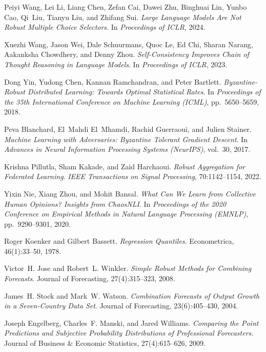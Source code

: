 Peiyi Wang, Lei Li, Liang Chen, Zefan Cai, Dawei Zhu, Binghuai Lin, Yunbo Cao,
Qi~Liu, Tianyu Liu, and Zhifang Sui.
\textit{Large Language Models Are Not Robust Multiple Choice Selectors}.
In \textit{Proceedings of ICLR}, 2024.

Xuezhi Wang, Jason Wei, Dale Schuurmans, Quoc Le, Ed Chi, Sharan Narang,
Aakanksha Chowdhery, and Denny Zhou.
\textit{Self-Consistency Improves Chain of Thought Reasoning in Language Models}.
In \textit{Proceedings of ICLR}, 2023.

Dong Yin, Yudong Chen, Kannan Ramchandran, and Peter Bartlett.
\textit{Byzantine-Robust Distributed Learning: Towards Optimal Statistical Rates}.
In \textit{Proceedings of the 35th International Conference on Machine Learning (ICML)},
pp.~5650--5659, 2018.

Peva Blanchard, El~Mahdi El~Mhamdi, Rachid Guerraoui, and Julien Stainer.
\textit{Machine Learning with Adversaries: Byzantine Tolerant Gradient Descent}.
In \textit{Advances in Neural Information Processing Systems (NeurIPS)}, vol.~30, 2017.

Krishna Pillutla, Sham Kakade, and Zaid Harchaoui.
\textit{Robust Aggregation for Federated Learning}.
\textit{IEEE Transactions on Signal Processing}, 70:1142--1154, 2022.

Yixin Nie, Xiang Zhou, and Mohit Bansal.
\textit{What Can We Learn from Collective Human Opinions? Insights from {ChaosNLI}}.
In \textit{Proceedings of the 2020 Conference on Empirical Methods in Natural Language
Processing (EMNLP)}, pp.~9290--9301, 2020.


Roger Koenker and Gilbert Bassett.
\textit{Regression Quantiles}.
Econometrica, 46(1):33--50, 1978.

Victor~H. Jose and Robert~L. Winkler.
\textit{Simple Robust Methods for Combining Forecasts}.
Journal of Forecasting, 27(4):315--323, 2008.

James~H. Stock and Mark~W. Watson.
\textit{Combination Forecasts of Output Growth in a Seven-Country Data Set}.
Journal of Forecasting, 23(6):405--430, 2004.

Joseph Engelberg, Charles~F. Manski, and Jared Williams.
\textit{Comparing the Point Predictions and Subjective Probability Distributions
  of Professional Forecasters}.
Journal of Business \& Economic Statistics, 27(4):615--626, 2009.

